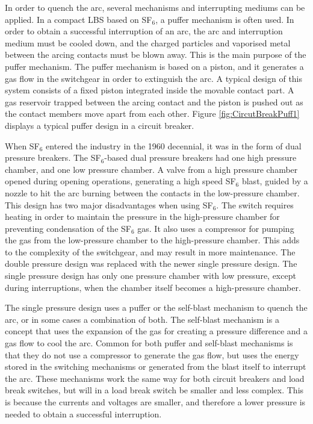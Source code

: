 \documentclass[10pt,b5paper,twoside]{article}
\begin{document}
In order to quench the arc, several mechanisms and interrupting mediums can be applied. In a compact LBS based on SF$_6$, a puffer mechanism is often used. In order to obtain a successful interruption of an arc, the arc and interruption medium must be cooled down, and the charged particles and vaporised metal between the arcing contacts must be blown away. This is the main purpose of the puffer mechanism. The puffer mechanism is based on a piston, and it generates a gas flow in the switchgear in order to extinguish the arc. A typical design of this system consists of a fixed piston integrated inside the movable contact part. A gas reservoir trapped between the arcing contact and the piston is pushed out as the contact members move apart from each other. Figure \ref{fig:CircutBreakPuff1} displays a typical puffer design in a circuit breaker.

When SF$_6$ entered the industry in the 1960 decennial, it was in the form of dual pressure breakers. The SF$_6$-based dual pressure breakers had one high pressure chamber, and one low pressure chamber. A valve from a high pressure chamber opened during opening operations, generating a high speed SF$_6$ blast, guided by a nozzle to hit the arc burning between the contacts in the low-pressure chamber. This design has two major disadvantages when using SF$_6$. The switch requires heating in order to maintain the pressure in the high-pressure chamber for preventing condensation of the SF$_6$ gas. It also uses a compressor for pumping the gas from the low-pressure chamber to the high-pressure chamber. This adds to the complexity of the switchgear, and may result in more maintenance. The double pressure design was replaced with the newer single pressure design. The single pressure design has only one pressure chamber with low pressure, except during interruptions, when the chamber itself becomes a high-pressure chamber.

The single pressure design uses a puffer or the self-blast mechanism to quench the arc, or in some cases a combination of both. The self-blast mechanism is a concept that uses the expansion of the gas for creating a pressure difference and a gas flow to cool the arc. Common for both puffer and self-blast mechanisms is that they do not use a compressor to generate the gas flow, but uses the energy stored in the switching mechanisms or generated from the blast itself to interrupt the arc. These mechanisms work the same way for both circuit breakers and load break switches, but will in a load break switch be smaller and less complex. This is because the currents and voltages are smaller, and therefore a lower pressure is needed to obtain a successful interruption.
\end{document}
